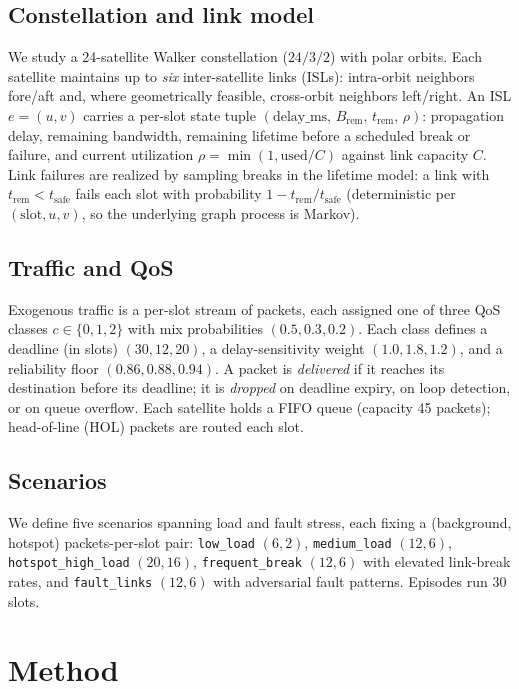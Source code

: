 \documentclass[conference,10pt]{IEEEtran}
\begin{document}
\subsection{Constellation and link model}
We study a 24-satellite Walker constellation ($24/3/2$) with polar orbits. Each satellite maintains up to \emph{six} inter-satellite links (ISLs): intra-orbit neighbors fore/aft and, where geometrically feasible, cross-orbit neighbors left/right. An ISL $e=(u,v)$ carries a per-slot state tuple $(\mathrm{delay\_ms},\,B_{\mathrm{rem}},\,t_{\mathrm{rem}},\,\rho)$: propagation delay, remaining bandwidth, remaining lifetime before a scheduled break or failure, and current utilization $\rho=\min(1,\mathrm{used}/C)$ against link capacity $C$. Link failures are realized by sampling breaks in the lifetime model: a link with $t_{\mathrm{rem}}<t_{\mathrm{safe}}$ fails each slot with probability $1-t_{\mathrm{rem}}/t_{\mathrm{safe}}$ (deterministic per $(\mathrm{slot},u,v)$, so the underlying graph process is Markov).

\subsection{Traffic and QoS}
Exogenous traffic is a per-slot stream of packets, each assigned one of three QoS classes $c\in\{0,1,2\}$ with mix probabilities $(0.5,0.3,0.2)$. Each class defines a deadline (in slots) $(30,12,20)$, a delay-sensitivity weight $(1.0,1.8,1.2)$, and a reliability floor $(0.86,0.88,0.94)$. A packet is \emph{delivered} if it reaches its destination before its deadline; it is \emph{dropped} on deadline expiry, on loop detection, or on queue overflow. Each satellite holds a FIFO queue (capacity 45 packets); head-of-line (HOL) packets are routed each slot.

\subsection{Scenarios}
We define five scenarios spanning load and fault stress, each fixing a (background, hotspot) packets-per-slot pair:
\texttt{low\_load} $(6,2)$, \texttt{medium\_load} $(12,6)$, \texttt{hotspot\_high\_load} $(20,16)$, \texttt{frequent\_break} $(12,6)$ with elevated link-break rates, and \texttt{fault\_links} $(12,6)$ with adversarial fault patterns. Episodes run 30 slots.

\section{Method}
\label{sec:method}
\end{document}
